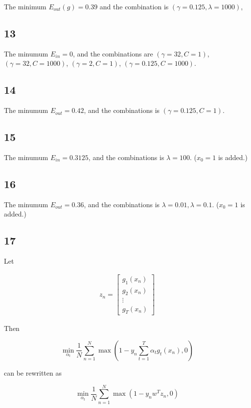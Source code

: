 \documentclass[fleqn,a4paper,12pt]{article}
\begin{document}
The minimum $E_{out}(g) = 0.39$ and the combination is  $(\gamma = 0.125, \lambda = 1000)$,

\subsection*{13}

The minumum $E_{in} = 0$, and the combinations are $(\gamma = 32, C = 1)$, $(\gamma = 32, C = 1000)$, $(\gamma = 2, C = 1)$, $(\gamma = 0.125, C = 1000)$.

\subsection*{14}

The minumum $E_{out} = 0.42$, and the combinations is $(\gamma = 0.125, C = 1)$.

\subsection*{15}

The minumum $E_{in} = 0.3125$, and the combinations is $\lambda=100$.
($x_0 = 1$ is added.)

\subsection*{16}

The minumum $E_{out} = 0.36$, and the combinations is $\lambda=0.01, \lambda=0.1$.
($x_0 = 1$ is added.)

\subsection*{17}

Let

\begin{align*}
  z_n = 
  \begin{bmatrix}
    g_1(x_n) \\
    g_2(x_n) \\
    \vdots \\
    g_T(x_n)
  \end{bmatrix}
\end{align*}

Then

$$\min_{\alpha_t} \frac{1}{N} \sum_{n=1}^N \max(1 - y_n \sum_{t=1}^T \alpha_t g_t(x_n), 0)$$

can be rewritten as

$$\min_{\alpha_t} \frac{1}{N} \sum_{n=1}^N \max(1 - y_n w^T z_n, 0)$$
\end{document}
